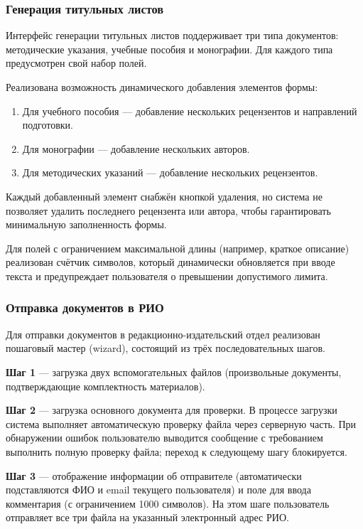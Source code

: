 \subsubsection{Генерация титульных листов}

Интерфейс генерации титульных листов поддерживает три типа документов: методические указания, учебные пособия и монографии. Для каждого типа предусмотрен свой набор полей.

Реализована возможность динамического добавления элементов формы:

\begin{enumerate}
	\item Для учебного пособия — добавление нескольких рецензентов и направлений подготовки.
	\item Для монографии — добавление нескольких авторов.
	\item Для методических указаний — добавление нескольких рецензентов.
\end{enumerate}

Каждый добавленный элемент снабжён кнопкой удаления, но система не позволяет удалить последнего рецензента или автора, чтобы гарантировать минимальную заполненность формы.

Для полей с ограничением максимальной длины (например, краткое описание) реализован счётчик символов, который динамически обновляется при вводе текста и предупреждает пользователя о превышении допустимого лимита.

\subsubsection{Отправка документов в РИО}

Для отправки документов в редакционно-издательский отдел реализован пошаговый мастер (wizard), состоящий из трёх последовательных шагов.

\textbf{Шаг 1} — загрузка двух вспомогательных файлов (произвольные документы, подтверждающие комплектность материалов).

\textbf{Шаг 2} — загрузка основного документа для проверки. В процессе загрузки система выполняет автоматическую проверку файла через серверную часть. При обнаружении ошибок пользователю выводится сообщение с требованием выполнить полную проверку файла; переход к следующему шагу блокируется.

\textbf{Шаг 3} — отображение информации об отправителе (автоматически подставляются ФИО и email текущего пользователя) и поле для ввода комментария (с ограничением 1000 символов). На этом шаге пользователь отправляет все три файла на указанный электронный адрес РИО.

